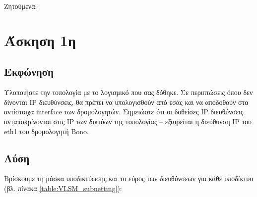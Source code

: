 \documentclass{assignment}
\begin{document}
Ζητούμενα:


\section{Άσκηση 1η}
\subsection{Εκφώνηση}

Υλοποιήστε την τοπολογία με το λογισμικό που σας δόθηκε. Σε περιπτώσεις όπου δεν δίνονται IP διευθύνσεις, θα πρέπει να υπολογισθούν από εσάς και να αποδοθούν στα αντίστοιχα interface των δρομολογητών. Σημειώστε ότι οι δοθείσες IP διευθύνσεις ανταποκρίνονται στις IP των δικτύων της τοπολογίας – εξαιρείται η διεύθυνση IP του eth1 του δρομολογητή Bono. 

\subsection{Λύση}


Βρίσκουμε τη μάσκα υποδικτύωσης και το εύρος των διευθύνσεων για κάθε υποδίκτυο (βλ. πίνακα \ref{table:VLSM_subnetting}):
\end{document}
